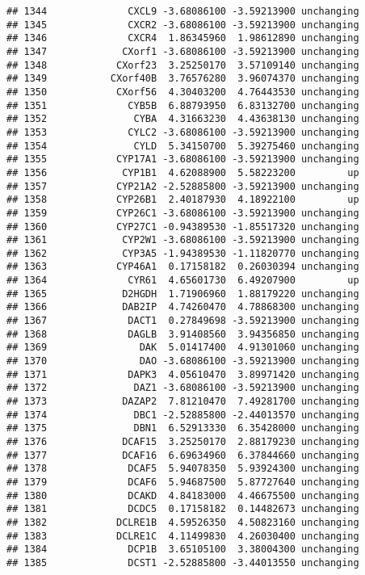 \documentclass[]{article}
\begin{document}
\begin{verbatim}
## 1344              CXCL9 -3.68086100 -3.59213900 unchanging
## 1345              CXCR2 -3.68086100 -3.59213900 unchanging
## 1346              CXCR4  1.86345960  1.98612890 unchanging
## 1347             CXorf1 -3.68086100 -3.59213900 unchanging
## 1348            CXorf23  3.25250170  3.57109140 unchanging
## 1349           CXorf40B  3.76576280  3.96074370 unchanging
## 1350            CXorf56  4.30403200  4.76443530 unchanging
## 1351              CYB5B  6.88793950  6.83132700 unchanging
## 1352               CYBA  4.31663230  4.43638130 unchanging
## 1353              CYLC2 -3.68086100 -3.59213900 unchanging
## 1354               CYLD  5.34150700  5.39275460 unchanging
## 1355            CYP17A1 -3.68086100 -3.59213900 unchanging
## 1356             CYP1B1  4.62088900  5.58223200         up
## 1357            CYP21A2 -2.52885800 -3.59213900 unchanging
## 1358            CYP26B1  2.40187930  4.18922100         up
## 1359            CYP26C1 -3.68086100 -3.59213900 unchanging
## 1360            CYP27C1 -0.94389530 -1.85517320 unchanging
## 1361             CYP2W1 -3.68086100 -3.59213900 unchanging
## 1362             CYP3A5 -1.94389530 -1.11820770 unchanging
## 1363            CYP46A1  0.17158182  0.26030394 unchanging
## 1364              CYR61  4.65601730  6.49207900         up
## 1365             D2HGDH  1.71906960  1.88179220 unchanging
## 1366             DAB2IP  4.74260470  4.78868300 unchanging
## 1367              DACT1  0.27849698 -3.59213900 unchanging
## 1368              DAGLB  3.91408560  3.94356850 unchanging
## 1369                DAK  5.01417400  4.91301060 unchanging
## 1370                DAO -3.68086100 -3.59213900 unchanging
## 1371              DAPK3  4.05610470  3.89971420 unchanging
## 1372               DAZ1 -3.68086100 -3.59213900 unchanging
## 1373             DAZAP2  7.81210470  7.49281700 unchanging
## 1374               DBC1 -2.52885800 -2.44013570 unchanging
## 1375               DBN1  6.52913330  6.35428000 unchanging
## 1376             DCAF15  3.25250170  2.88179230 unchanging
## 1377             DCAF16  6.69634960  6.37844660 unchanging
## 1378              DCAF5  5.94078350  5.93924300 unchanging
## 1379              DCAF6  5.94687500  5.87727640 unchanging
## 1380              DCAKD  4.84183000  4.46675500 unchanging
## 1381              DCDC5  0.17158182  0.14482673 unchanging
## 1382            DCLRE1B  4.59526350  4.50823160 unchanging
## 1383            DCLRE1C  4.11499830  4.26030400 unchanging
## 1384              DCP1B  3.65105100  3.38004300 unchanging
## 1385              DCST1 -2.52885800 -3.44013550 unchanging

\end{verbatim}
\end{document}
